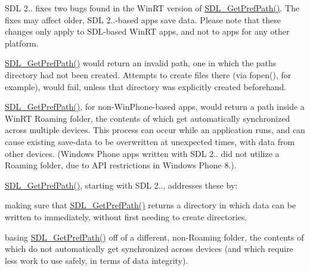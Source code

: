 S\+DL 2.. fixes two bugs found in the Win\+RT version of \mbox{\hyperlink{_s_d_l__filesystem_8h_ab11eaf74d913eefb472475f0c8e312ce}{S\+D\+L\+\_\+\+Get\+Pref\+Path()}}. The fixes may affect older, S\+DL 2..-\/based apps\textquotesingle{} save data. Please note that these changes only apply to S\+D\+L-\/based Win\+RT apps, and not to apps for any other platform.


\begin{DoxyEnumerate}
\item \mbox{\hyperlink{_s_d_l__filesystem_8h_ab11eaf74d913eefb472475f0c8e312ce}{S\+D\+L\+\_\+\+Get\+Pref\+Path()}} would return an invalid path, one in which the path\textquotesingle{}s directory had not been created. Attempts to create files there (via fopen(), for example), would fail, unless that directory was explicitly created beforehand.
\item \mbox{\hyperlink{_s_d_l__filesystem_8h_ab11eaf74d913eefb472475f0c8e312ce}{S\+D\+L\+\_\+\+Get\+Pref\+Path()}}, for non-\/\+Win\+Phone-\/based apps, would return a path inside a Win\+RT \textquotesingle{}Roaming\textquotesingle{} folder, the contents of which get automatically synchronized across multiple devices. This process can occur while an application runs, and can cause existing save-\/data to be overwritten at unexpected times, with data from other devices. (Windows Phone apps written with S\+DL 2.. did not utilize a Roaming folder, due to A\+PI restrictions in Windows Phone 8.).
\end{DoxyEnumerate}

\mbox{\hyperlink{_s_d_l__filesystem_8h_ab11eaf74d913eefb472475f0c8e312ce}{S\+D\+L\+\_\+\+Get\+Pref\+Path()}}, starting with S\+DL 2.., addresses these by\+:


\begin{DoxyEnumerate}
\item making sure that \mbox{\hyperlink{_s_d_l__filesystem_8h_ab11eaf74d913eefb472475f0c8e312ce}{S\+D\+L\+\_\+\+Get\+Pref\+Path()}} returns a directory in which data can be written to immediately, without first needing to create directories.
\item basing \mbox{\hyperlink{_s_d_l__filesystem_8h_ab11eaf74d913eefb472475f0c8e312ce}{S\+D\+L\+\_\+\+Get\+Pref\+Path()}} off of a different, non-\/\+Roaming folder, the contents of which do not automatically get synchronized across devices (and which require less work to use safely, in terms of data integrity).
\end{DoxyEnumerate}

